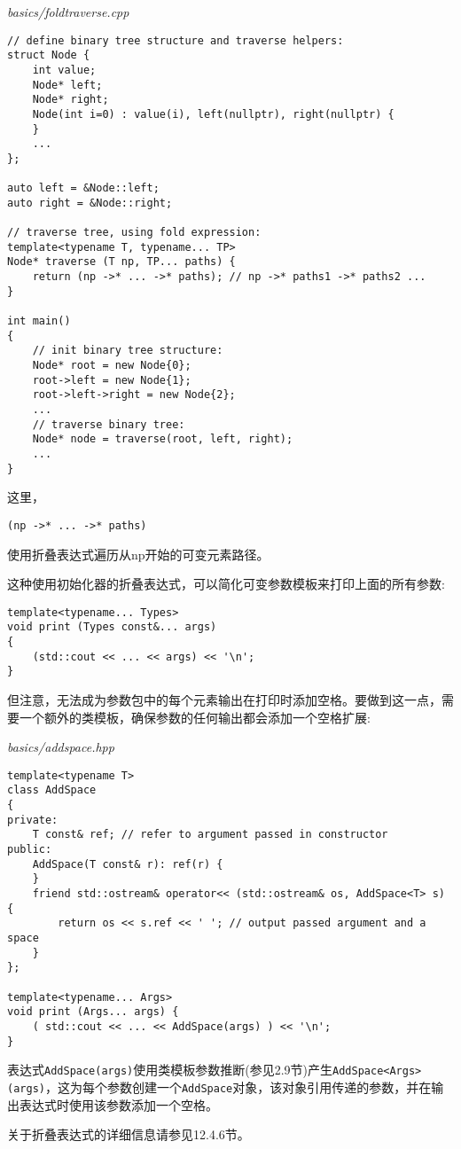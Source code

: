 \noindent
\textit{basics/foldtraverse.cpp}
\begin{lstlisting}[style=styleCXX]
// define binary tree structure and traverse helpers:
struct Node {
	int value;
	Node* left;
	Node* right;
	Node(int i=0) : value(i), left(nullptr), right(nullptr) {
	}
	...
};

auto left = &Node::left;
auto right = &Node::right;

// traverse tree, using fold expression:
template<typename T, typename... TP>
Node* traverse (T np, TP... paths) {
	return (np ->* ... ->* paths); // np ->* paths1 ->* paths2 ...
}

int main()
{
	// init binary tree structure:
	Node* root = new Node{0};
	root->left = new Node{1};
	root->left->right = new Node{2};
	...
	// traverse binary tree:
	Node* node = traverse(root, left, right);
	...
}
\end{lstlisting}

这里，

\begin{lstlisting}[style=styleCXX]
(np ->* ... ->* paths)
\end{lstlisting}

使用折叠表达式遍历从np开始的可变元素路径。

这种使用初始化器的折叠表达式，可以简化可变参数模板来打印上面的所有参数:

\begin{lstlisting}[style=styleCXX]
template<typename... Types>
void print (Types const&... args)
{
	(std::cout << ... << args) << '\n';
}
\end{lstlisting}

但注意，无法成为参数包中的每个元素输出在打印时添加空格。要做到这一点，需要一个额外的类模板，确保参数的任何输出都会添加一个空格扩展:

\noindent
\textit{basics/addspace.hpp}
\begin{lstlisting}[style=styleCXX]
template<typename T>
class AddSpace
{
private:
	T const& ref; // refer to argument passed in constructor
public:
	AddSpace(T const& r): ref(r) {
	}
	friend std::ostream& operator<< (std::ostream& os, AddSpace<T> s) {
		return os << s.ref << ' '; // output passed argument and a space
	}
};

template<typename... Args>
void print (Args... args) {
	( std::cout << ... << AddSpace(args) ) << '\n';
}
\end{lstlisting}

表达式\texttt{AddSpace(args)}使用类模板参数推断(参见2.9节)产生\texttt{AddSpace<Args>(args)}，这为每个参数创建一个\texttt{AddSpace}对象，该对象引用传递的参数，并在输出表达式时使用该参数添加一个空格。

关于折叠表达式的详细信息请参见12.4.6节。
































